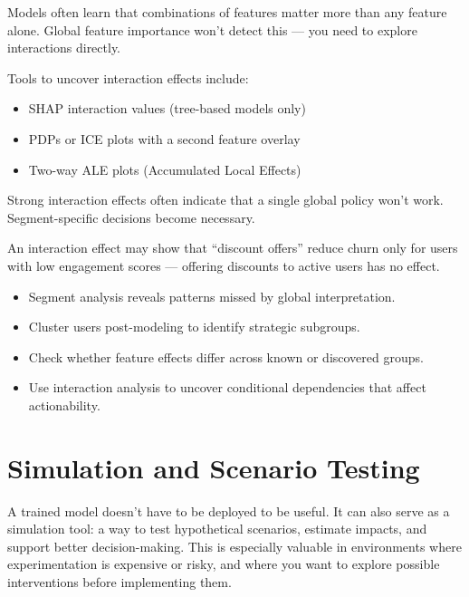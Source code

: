 \documentclass[12pt,openany, draft]{book}
\begin{document}
Models often learn that combinations of features matter more than any feature alone. Global feature importance won’t detect this — you need to explore interactions directly.

Tools to uncover interaction effects include:
\begin{itemize}
  \item SHAP interaction values (tree-based models only)
  \item PDPs or ICE plots with a second feature overlay
  \item Two-way ALE plots (Accumulated Local Effects)
\end{itemize}

\begin{notebox}
Strong interaction effects often indicate that a single global policy won't work. Segment-specific decisions become necessary.
\end{notebox}

\begin{examplebox}
An interaction effect may show that ``discount offers'' reduce churn only for users with low engagement scores — offering discounts to active users has no effect.
\end{examplebox}

\begin{summarybox}
\begin{itemize}
  \item Segment analysis reveals patterns missed by global interpretation.
  \item Cluster users post-modeling to identify strategic subgroups.
  \item Check whether feature effects differ across known or discovered groups.
  \item Use interaction analysis to uncover conditional dependencies that affect actionability.
\end{itemize}
\end{summarybox}




\chapter{Simulation and Scenario Testing}

A trained model doesn’t have to be deployed to be useful. It can also serve as a simulation tool: a way to test hypothetical scenarios, estimate impacts, and support better decision-making. This is especially valuable in environments where experimentation is expensive or risky, and where you want to explore possible interventions before implementing them.
\end{document}
